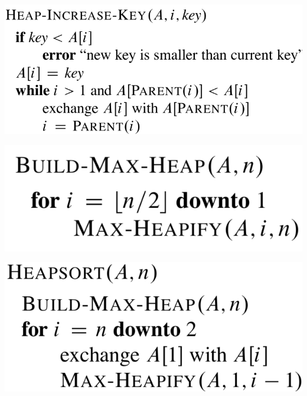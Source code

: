 {{\begin{minipage}[t]{0.35\textwidth}
        \includegraphics[width=0.7\linewidth]{images/heap-increase-key.png}
        \vspace{6pt}
        
        \includegraphics[width=0.7\linewidth]{images/build-max-heap.png}
        \vspace{6pt}
        
        \includegraphics[width=0.7\linewidth]{images/heapsort.png}
    \end{minipage}
}} 